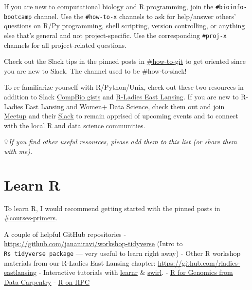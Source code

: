 \documentclass[
  letterpaper,
  DIV=11,
  numbers=noendperiod]{scrreprt}
\begin{document}
If you are new to computational biology and R programming, join the
\texttt{\#bioinfo-bootcamp} channel. Use the \texttt{\#how-to-x}
channels to ask for help/answer others' questions on R/Py programming,
shell scripting, version controlling, or anything else that's general
and not project-specific. Use the corresponding \texttt{\#proj-x}
channels for all project-related questions.

Check out the Slack tips in the pinned posts in
\href{https://jravilab.slack.com/archives/CATMCKFT9}{\#how-to-git} to
get oriented since you are new to Slack. The channel used to be
\#how-to-slack!

To re-familiarize yourself with R/Python/Unix, check out these two
resources in addition to Slack \textbar{}
\href{https://github.com/jananiravi/compbio-gists}{CompBio gists} and
\href{https://github.com/rladies-eastlansing}{R-Ladies East Lansing}. If
you are new to R-Ladies East Lansing and Women+ Data Science, check them
out and join \href{https://meetup.com/rladies-eastlansing}{Meetup} and
their \href{https://rladies-eastlansing.slack.com/}{Slack} to remain
apprised of upcoming events and to connect with the local R and data
science communities.

💡\emph{If you find other useful resources, please add them to
\href{https://github.com/jananiravi/compbio-gists}{this list} (or share
them with me).}

\hypertarget{learn-r}{%
\section{Learn R}\label{learn-r}}

To learn R, I would recommend getting started with the pinned posts in
\href{https://jravilab.slack.com/archives/CARJ72W3U}{\#courses-primers}.

A couple of helpful GitHub repositories -
\url{https://github.com/jananiravi/workshop-tidyverse} (Intro to
\texttt{R\textquotesingle{}s\ tidyverse\ package} --- very useful to
learn right away) - Other R workshop materials from our R-Ladies East
Lansing chapter: \url{https://github.com/rladies-eastlansing} -
Interactive tutorials with
\href{https://rstudio.github.io/learnr/}{learnr} \&
\href{https://swirlstats.com/}{swirl}. -
\href{https://datacarpentry.org/R-genomics/index.html}{R for Genomics
from Data Carpentry} -
\href{https://github.com/JRaviLab/group/tree/master/resources-courses/r-on-hpc}{R
on HPC}
\end{document}
